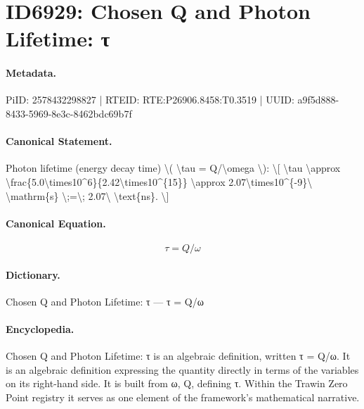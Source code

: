 \section*{ID6929: Chosen Q and Photon Lifetime: τ}
\paragraph{Metadata.}
PiID: 2578432298827 | RTEID: RTE:P26906.8458:T0.3519 | UUID: a9f5d888-8433-5969-8e3c-8462bdc69b7f

\paragraph{Canonical Statement.}
Photon lifetime (energy decay time) \textbackslash{}( \textbackslash{}tau = Q/\textbackslash{}omega \textbackslash{}): \textbackslash{}[ \textbackslash{}tau \textbackslash{}approx \textbackslash{}frac\{5.0\textbackslash{}times10\textasciicircum{}6\}\{2.42\textbackslash{}times10\textasciicircum{}\{15\}\} \textbackslash{}approx 2.07\textbackslash{}times10\textasciicircum{}\{-9\}\textbackslash{} \textbackslash{}mathrm\{s\} \textbackslash{};=\textbackslash{}; 2.07\textbackslash{} \textbackslash{}text\{ns\}. \textbackslash{}]

\paragraph{Canonical Equation.}
\[
\tau = Q/\omega
\]

\paragraph{Dictionary.}
Chosen Q and Photon Lifetime: τ — τ = Q/ω

\paragraph{Encyclopedia.}
Chosen Q and Photon Lifetime: τ is an algebraic definition, written τ = Q/ω. It is an algebraic definition expressing the quantity directly in terms of the variables on its right-hand side. It is built from ω, Q, defining τ. Within the Trawin Zero Point registry it serves as one element of the framework's mathematical narrative.
